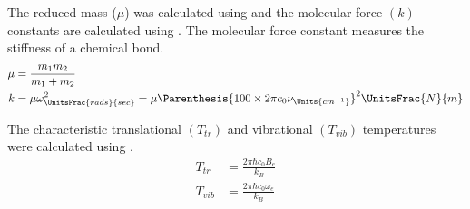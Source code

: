     The reduced mass ($\mu$) was calculated using  and the
    molecular force $(k)$
    constants are calculated using . The molecular force
    constant measures the stiffness of a chemical bond.
    \begin{subequations}\label{eq:additionalDiatomicCalculations}
        \begin{align}
            \mu &= \frac{m_1 m_2}{m_1 + m_2} \label{eq:reducedMass} \\
            k &= \mu\omega^2_{\UnitsFrac{rads}{sec}} = \mu\Parenthesis{ 100
            \times 2\pi c_0
            \nu_{\Units{cm^{-1}}}}^2 \UnitsFrac{N}{m}
            \label{eq:forceConstant} 
        \end{align}
    \end{subequations}

    The characteristic translational $(T_{tr})$ and vibrational $(T_{vib})$ temperatures were
    calculated using .
    \begin{subequations}\label{eq:characteristic2Tspectroscopy}
        \begin{align}
            T_{tr} &= \frac{2\pi\hbar c_0 B_e}{k_B}
            \label{eq:translationalTemperatureSpec} \\
            T_{vib} &= \frac{2\pi\hbar c_0 \omega_e}{k_B}
            \label{eq:vibrationalTemperatureSpec}
        \end{align}
    \end{subequations}

